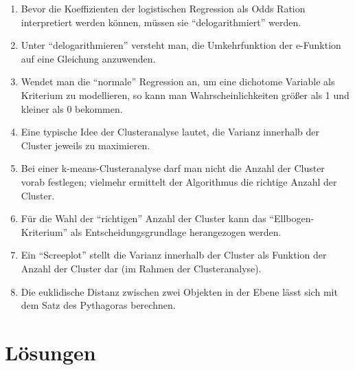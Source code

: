 \documentclass[12pt,ngerman,]{book}
\theoremstyle{definition}
\theoremstyle{definition}
\theoremstyle{remark}
\begin{document}
\begin{enumerate}
\def\labelenumi{\arabic{enumi}.}
\setcounter{enumi}{32}
\item
  Bevor die Koeffizienten der logistischen Regression als Odds Ration
  interpretiert werden können, müssen sie ``delogarithmiert'' werden.
\item
  Unter ``delogarithmieren'' versteht man, die Umkehrfunktion der
  e-Funktion auf eine Gleichung anzuwenden.
\item
  Wendet man die ``normale'' Regression an, um eine dichotome Variable
  als Kriterium zu modellieren, so kann man Wahrscheinlichkeiten größer
  als 1 und kleiner als 0 bekommen.
\item
  Eine typische Idee der Clusteranalyse lautet, die Varianz innerhalb
  der Cluster jeweils zu maximieren.
\item
  Bei einer k-means-Clusteranalyse darf man nicht die Anzahl der Cluster
  vorab festlegen; vielmehr ermittelt der Algorithmus die richtige
  Anzahl der Cluster.
\item
  Für die Wahl der ``richtigen'' Anzahl der Cluster kann das
  ``Ellbogen-Kriterium'' als Entscheidungsgrundlage herangezogen werden.
\item
  Ein ``Screeplot'' stellt die Varianz innerhalb der Cluster als
  Funktion der Anzahl der Cluster dar (im Rahmen der Clusteranalyse).
\item
  Die euklidische Distanz zwischen zwei Objekten in der Ebene lässt sich
  mit dem Satz des Pythagoras berechnen.
\end{enumerate}

\section{Lösungen}\label{losungen-1}
\end{document}
